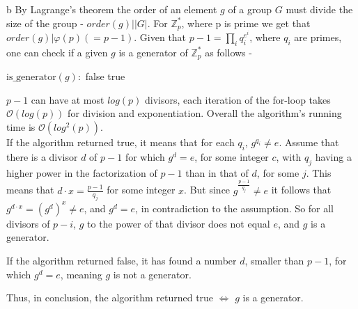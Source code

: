 \documentclass{article}
\makeatletter
\newcommand{\tpmod}[1]{{\@displayfalse\pmod{#1}}}
\makeatother
\begin{document}
\begin{paragraph}
	b By Lagrange's theorem the order of an element $g$ of a group $G$ must divide the size of the group - $order(g) | |G|$. For $\mathbb{Z}^*_p$, where p is prime we get that $order(g) | \varphi(p)(=p-1)$. Given that $p-1 =\prod_i{q_i^{e^i}}$, where $q_i$ are primes, one can check if a given $g$ is a generator of $\mathbb{Z}^*_p$ as follows - 
    \begin{algorithm}
    	\begin{algorithmic}[]
    		\State $\text{is\_generator}( \textit{g} ):$
    			\If {$g^{\frac{p-1}{q_i}}= 1 \tpmod p$} \Return false
    			\EndIf
    		  \EndFor
    		\State \Return true
    	\end{algorithmic}
	\end{algorithm}

	$p-1$ can have at most $log(p)$ divisors, each iteration of the for-loop takes $\mathcal{O}(log(p))$ for division and exponentiation. Overall the algorithm's running time is $\mathcal{O}(log^2(p))$.\\

    If the algorithm returned true, it means that for each \(q_i\), \(g^{q_i} \neq e\). Assume that there is a divisor \(d\) of \(p - 1\) for which \(g^d = e\), for some integer \(c\), with \(q_j\) having a higher power in the factorization of \(p - 1\) than in that of \(d\), for some \(j\). This means that \(d \cdot x = \frac{p - 1}{q_j}\) for some integer \(x\). But since \(g^{\frac{p - 1}{q_j}} \neq e\) it follows that \(g^{d \cdot x} = (g^d)^x \neq e\), and \(g^d = e\), in contradiction to the assumption. So for all divisors of \(p - i\), \(g\) to the power of that divisor does not equal \(e\), and \(g\) is a generator.
    
    If the algorithm returned false, it has found a number \(d\), smaller than \(p - 1\), for which \(g^d = e\), meaning \(g\) is not a generator.
    
    Thus, in conclusion, the algorithm returned true \(\iff\) \(g\) is a generator.
\end{paragraph}
\newpage
\end{document}
